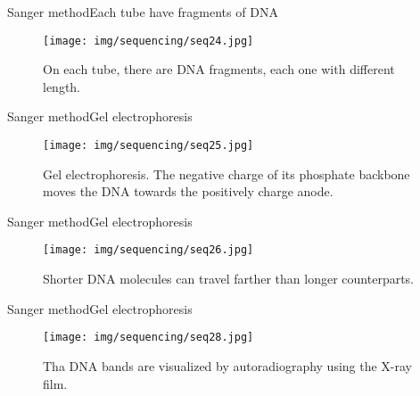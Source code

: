 \documentclass[10pt]{beamer}
\newcommand{\1}{
	\setbeamertemplate{background}{
		\texttt{[image: img/1]}
		\tikz[overlay] \fill[fill opacity=0.75,fill=white] (0,0) rectangle (-\paperwidth,\paperheight);
	}
}
\begin{document}
\begin{frame}{Sanger method}{Each tube have fragments of DNA}
	\begin{figure}[]
		\centering
		\texttt{[image: img/sequencing/seq24.jpg]}
		\label{img:mot2}
		\caption{On each tube, there are DNA fragments, each one with different length.}
	\end{figure}
\end{frame}

\begin{frame}{Sanger method}{Gel electrophoresis}
	\begin{figure}[]
		\centering
		\texttt{[image: img/sequencing/seq25.jpg]}
		\label{img:mot2}
		\caption{Gel electrophoresis. The negative charge of its phosphate backbone moves the DNA towards the positively charge anode.}
	\end{figure}
\end{frame}

\begin{frame}{Sanger method}{Gel electrophoresis}
	\begin{figure}[]
		\centering
		\texttt{[image: img/sequencing/seq26.jpg]}
		\label{img:mot2}
		\caption{Shorter DNA molecules can travel farther than longer counterparts.}
	\end{figure}
\end{frame}

\begin{frame}{Sanger method}{Gel electrophoresis}
	\begin{figure}[]
		\centering
		\texttt{[image: img/sequencing/seq28.jpg]}
		\label{img:mot2}
		\caption{Tha DNA bands are visualized by autoradiography using the X-ray film.}
	\end{figure}
\end{frame}
\end{document}
